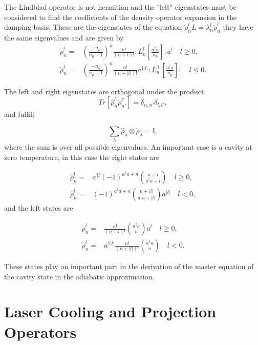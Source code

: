 \documentclass[reprint, amsmath,amssymb, aps,pra]{revtex4-1}
\begin{document}
The Lindblad operator is not hermitian and the "left" eigenstates must
be considered to find the coefficients of the density operator
expansion in the damping basis. These are the eigenstates of the
equation $\check{\rho}_n^lL = \lambda_n^l\check{\rho}_n^l$ they have
the same eigenvalues and are given by
\begin{align}\label{DefDBDual}
\check{\rho}_n^l=&(\frac{-n_p}{n_p+1})^n\frac{n!}{(n+l)!}:L_n^l[\frac{a^\dagger a}{n_p}]:a^{l}\quad l \geq 0, \\
\check{\rho}_n^l=&(\frac{-n_p}{n_p+1})^n\frac{n!}{(n+|l|)!}a^{\dagger|l|}:L_n^{|l|}[\frac{a^\dagger a}{n_p}]:\quad l \leq 0.
\end{align}

The left and right eigenstates are orthogonal under the product
\begin{equation}
Tr[\hat{\rho}_n^l\check{\rho}_{n'}^{l'}] = \delta_{n,n'}\delta_{l,l'},
\end{equation} and fulfill

\begin{equation}\label{DampingBasisCompleteness}
\sum_{\lambda} \hat{\rho}_\lambda \otimes \check{\rho}_\lambda = \mathbb{I},
\end{equation} where the sum is over all possible eigenvalues. An important case is a cavity at zero temperature, in this case the right states are \cite{EnglertDB}

\begin{align}\label{DefDBZero}
\hat{\rho}_n^l=&a^{\dagger l}(-1)^{a^\dagger a + n}\binom{n+l}{a^\dagger a+l} \quad l \geq 0, \\
\hat{\rho}_n^l=&(-1)^{a^\dagger a + n}\binom{n+|l|}{a^\dagger a+|l|}a^{|l|} \quad l < 0,
\end{align} and the left states are

\begin{align}\label{DefDBDualZero}
\check{\rho}_n^l=&\frac{n!}{(n+l)!}\binom{a^\dagger a}{n}a^l \quad l \geq 0, \\
\check{\rho}_n^l=&a^{\dagger|l|}\frac{n!}{(n+|l|)!}\binom{a^\dagger a}{n} \quad l < 0.
\end{align}

These states play an important part in the derivation of the master
equation of the cavity state in the adiabatic approximation.

\section{Laser Cooling and Projection Operators}\label{CoolingAppendix}
\end{document}
